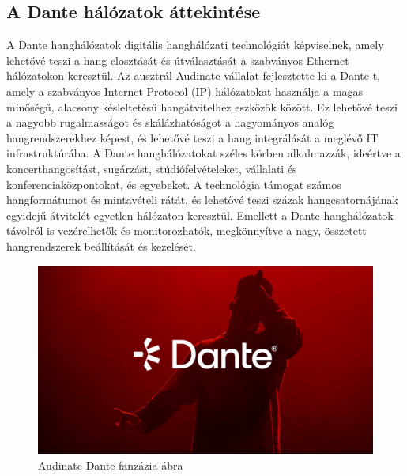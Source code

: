 \subsection{A Dante hálózatok áttekintése}
A Dante hanghálózatok digitális hanghálózati technológiát képviselnek, amely
lehetővé teszi a hang elosztását és útválasztását a szabványos Ethernet
hálózatokon keresztül. Az ausztrál Audinate vállalat fejlesztette ki a Dante-t,
amely a szabványos Internet Protocol (IP) hálózatokat használja a magas minőségű,
alacsony késleltetésű hangátvitelhez eszközök között. Ez lehetővé teszi a
nagyobb rugalmasságot és skálázhatóságot a hagyományos analóg hangrendszerekhez
képest, és lehetővé teszi a hang integrálását a meglévő IT infrastruktúrába. A
Dante hanghálózatokat széles körben alkalmazzák, ideértve a koncerthangosítást,
sugárzást, stúdiófelvételeket, vállalati és konferenciaközpontokat, és egyebeket.
A technológia támogat számos hangformátumot és mintavételi rátát, és lehetővé
teszi százak hangcsatornájának egyidejű átvitelét egyetlen hálózaton keresztül.
Emellett a Dante hanghálózatok távolról is vezérelhetők és monitorozhatók,
megkönnyítve a nagy, összetett hangrendszerek beállítását és kezelését.
\begin{figure}[H]
	\centering
	\includegraphics[width=\linewidth, keepaspectratio]{figures/dante_visual.jpg}
	\caption{Audinate Dante fanzázia ábra}
	\label {fig:dante_visual}
\end{figure}





